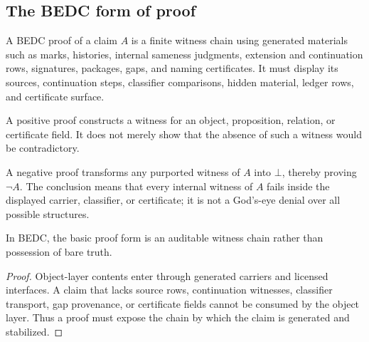 \subsection{The BEDC form of proof}
\label{subsec:philosophy-bedc-form-proof}

\begin{definition}
\label{def:philosophy-bedc-proof}
A BEDC proof of a claim \(A\) is a finite witness chain using generated
materials such as marks, histories, internal sameness judgments,
extension and continuation rows, signatures, packages, gaps, and naming
certificates. It must display its sources, continuation steps,
classifier comparisons, hidden material, ledger rows, and certificate
surface.
\end{definition}

\begin{definition}
\label{def:philosophy-positive-proof}
A positive proof constructs a witness for an object, proposition,
relation, or certificate field. It does not merely show that the
absence of such a witness would be contradictory.
\end{definition}

\begin{definition}
\label{def:philosophy-negative-proof}
A negative proof transforms any purported witness of \(A\) into
\(\bot\), thereby proving \(\neg A\). The conclusion means that every
internal witness of \(A\) fails inside the displayed carrier,
classifier, or certificate; it is not a God's-eye denial over all
possible structures.
\end{definition}

\begin{theorem}
\label{thm:philosophy-proof-witness-not-truth-possession}
In BEDC, the basic proof form is an auditable witness chain rather than
possession of bare truth.
\end{theorem}
\begin{proof}
Object-layer contents enter through generated carriers and licensed
interfaces. A claim that lacks source rows, continuation witnesses,
classifier transport, gap provenance, or certificate fields cannot be
consumed by the object layer. Thus a proof must expose the chain by
which the claim is generated and stabilized.
\end{proof}

